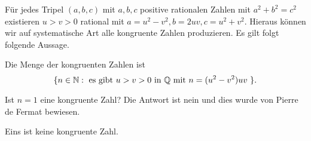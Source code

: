 Für jedes Tripel $(a,b,c)$ mit $a,b,c$ positive rationalen Zahlen mit
$a^2+b^2=c^2$ existieren $u>v>0$ rational mit $a =
u^2-v^2,b=2uv,c=u^2+v^2$. Hieraus können wir auf systematische Art
alle kongruente Zahlen produzieren. Es gilt folgt folgende Aussage.

\begin{lemma}
  Die Menge der kongruenten Zahlen ist
  $$
  \{ n \in {\mathbb{N}} : \text{ es gibt $u>v>0$ in ${\mathbb{Q}}$ mit $n=(u^2-v^2)uv$ }
  \}.
  $$
\end{lemma}


Ist $n=1$ eine kongruente Zahl? Die Antwort ist nein und dies wurde
von Pierre de Fermat bewiesen.

\begin{satz}[Fermat]
  \label{satz:fermat}
  Eins  ist keine kongruente Zahl.
\end{satz}
